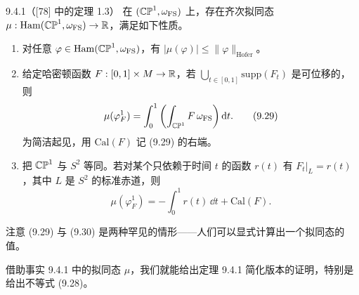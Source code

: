 \begin{wfact}{9.4.1}（[78] 中的定理 1.3）
在 $(\mathbb{CP}^1,\omega_{\mathrm{FS}})$ 上，存在齐次拟同态
$\mu:\operatorname{Ham}(\mathbb{CP}^1,\omega_{\mathrm{FS}})\to\mathbb{R}$，满足如下性质。
\begin{enumerate}[label=(\roman*)]
  \item 对任意 $\varphi\in\operatorname{Ham}(\mathbb{CP}^1,\omega_{\mathrm{FS}})$，有
        $|\mu(\varphi)|\le\|\varphi\|_{\mathrm{Hofer}}$。
  \item 给定哈密顿函数 $F:[0,1]\times M\to\mathbb{R}$，若
        $\bigcup_{t\in[0,1]}\mathrm{supp}(F_t)$ 是可位移的，则
    \begin{equation}
      \mu(\varphi_F^1)=\int_0^1\left(\int_{\mathbb{CP}^1}F\,\omega_{\mathrm{FS}}\right)\mathrm{d} t .
      \tag{9.29}
    \end{equation}
        为简洁起见，用 $\mathrm{Cal}(F)$ 记 (9.29) 的右端。
  \item 把 $\mathbb{CP}^1$ 与 $S^2$ 等同。若对某个只依赖于时间 $t$ 的函数 $r(t)$ 有
        $F_t|_L=r(t)$，其中 $L$ 是 $S^2$ 的标准赤道，则
    \begin{equation}
      \mu(\varphi_F^1)=-\int_0^1r(t)\,\dd t+\mathrm{Cal}(F).
      \tag{9.30}
    \end{equation}
\end{enumerate}
\end{wfact}

注意 (9.29) 与 (9.30) 是两种罕见的情形——人们可以显式计算出一个拟同态的值。

借助事实 9.4.1 中的拟同态 $\mu$，我们就能给出定理 9.4.1 简化版本的证明，特别是给出不等式
(9.28)。

